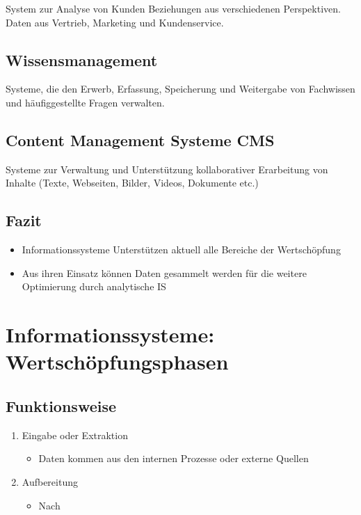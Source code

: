 \begin{definition}
    [CRM] System zur Analyse von Kunden Beziehungen aus verschiedenen Perspektiven. Daten aus Vertrieb, Marketing und Kundenservice.
\end{definition}


\subsection{Wissensmanagement}
\begin{definition}
    [Wissensmanagement] Systeme, die den Erwerb, Erfassung, Speicherung und Weitergabe von Fachwissen und häufiggestellte Fragen verwalten. 
\end{definition}

\subsection{Content Management Systeme CMS}
\begin{definition}
    [CMS] Systeme zur Verwaltung und Unterstützung kollaborativer Erarbeitung von Inhalte (Texte, Webseiten, Bilder, Videos, Dokumente etc.) 
\end{definition}

\subsection{Fazit}

\begin{itemize}
    \item Informationssysteme Unterstützen aktuell alle Bereiche der Wertschöpfung
    \item Aus ihren Einsatz können Daten gesammelt werden für die weitere Optimierung durch analytische IS
\end{itemize}

\section{Informationssysteme: Wertschöpfungsphasen}

\subsection{Funktionsweise}


\begin{enumerate}
    \item Eingabe oder Extraktion
    \begin{itemize}
        \item Daten kommen aus den internen Prozesse oder externe Quellen
    \end{itemize}
    \item Aufbereitung 
    \begin{itemize}
        \item Nach
    \end{itemize}
\end{enumerate}
